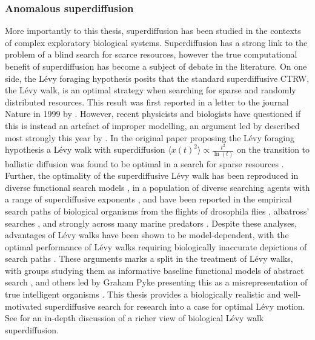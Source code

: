 \subsubsection*{Anomalous superdiffusion}\label{subsubsec:anomalous_superdiffusion}
More importantly to this thesis, superdiffusion has been studied in the contexts of complex exploratory biological systems. Superdiffusion has a strong link to the problem of a blind search for scarce resources, however the true computational benefit of superdiffusion has become a subject of debate in the literature. On one side, the Lévy foraging hypothesis posits that the standard superdiffusive CTRW, the Lévy walk, is an optimal strategy when searching for sparse and randomly distributed resources. This result was first reported in a letter to the journal Nature in 1999 by \textcite{viswanathan_optimizing_1999}. However, recent physicists and biologists have questioned if this is instead an artefact of improper modelling, an argument led by described most strongly this year by \textcite{pyke_levy_2026}. In the original paper proposing the Lévy foraging hypothesis a Lévy walk with superdiffusion $\langle x(t) ^2 \rangle \propto \frac{t^2}{\ln(t)}$ on the transition to ballistic diffusion was found to be optimal in a search for sparse resources \cite{viswanathan_optimizing_1999}. Further, the optimality of the superdiffusive Lévy walk has been reproduced in diverse functional search models \cite{humphries_optimal_2014, campeau_evolutionary_2022, sims_optimal_2019}, in a population of diverse searching agents with a range of superdiffusive exponents \cite{clementi_search_2021}, and have been reported in the empirical search paths of biological organisms from the flights of drosophila flies \cite{sims_optimal_2019, reynolds_free-flight_2007}, albatross' searches \cite{focardi_levy_2014, humphries_new_2013}, and strongly across many marine predators \cite{sims_scaling_2008, humphries_environmental_2010}. Despite these analyses, advantages of Lévy walks have been shown to be model-dependent, with the optimal performance of Lévy walks requiring biologically inaccurate depictions of search paths \cite{pyke_levy_2026, gautestad_levy_2013, pyke_understanding_2015}. These arguments marks a split in the treatment of Lévy walks, with groups studying them as informative baseline functional models of abstract search \cite{viswanathan_optimizing_1999, gautestad_levy_2013, humphries_optimal_2014, clementi_search_2021}, and others led by Graham Pyke presenting this as a misrepresentation of true intelligent organisms \cite{pyke_levy_2026, pyke_understanding_2015, benhamou_ultimate_2015}. This thesis provides a biologically realistic and well-motivated superdiffusive search for research into a case for optimal Lévy motion. See \textcite{reynolds_liberating_2015} for an in-depth discussion of a richer view of biological Lévy walk superdiffusion.
